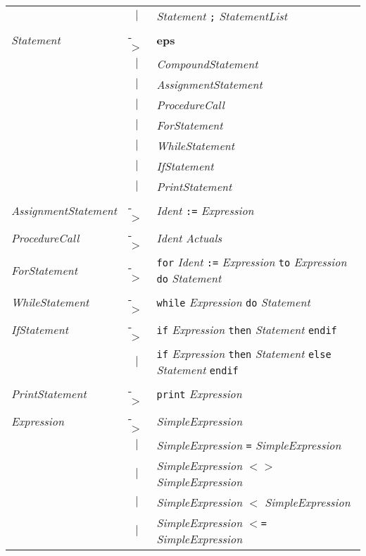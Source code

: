 \documentclass{article}
\begin{document}
\begin{center}
\begin{tabular}{lll}
 & \multicolumn{1}{c}{\textbf{$|$}} & \textit{Statement} \texttt{;} \textit{StatementList} \\
\textit{Statement} & -$>$ & \textbf{eps} \\
 & \multicolumn{1}{c}{\textbf{$|$}} & \textit{CompoundStatement} \\
 & \multicolumn{1}{c}{\textbf{$|$}} & \textit{AssignmentStatement} \\
 & \multicolumn{1}{c}{\textbf{$|$}} & \textit{ProcedureCall} \\
 & \multicolumn{1}{c}{\textbf{$|$}} & \textit{ForStatement} \\
 & \multicolumn{1}{c}{\textbf{$|$}} & \textit{WhileStatement} \\
 & \multicolumn{1}{c}{\textbf{$|$}} & \textit{IfStatement} \\
 & \multicolumn{1}{c}{\textbf{$|$}} & \textit{PrintStatement} \\
\textit{AssignmentStatement} & -$>$ & \textit{Ident} \texttt{:=} \textit{Expression} \\
\textit{ProcedureCall} & -$>$ & \textit{Ident} \textit{Actuals} \\
\textit{ForStatement} & -$>$ & \texttt{for} \textit{Ident} \texttt{:=} \textit{Expression} \texttt{to} \textit{Expression} \texttt{do} \textit{Statement} \\
\textit{WhileStatement} & -$>$ & \texttt{while} \textit{Expression} \texttt{do} \textit{Statement} \\
\textit{IfStatement} & -$>$ & \texttt{if} \textit{Expression} \texttt{then} \textit{Statement} \texttt{endif} \\
 & \multicolumn{1}{c}{\textbf{$|$}} & \texttt{if} \textit{Expression} \texttt{then} \textit{Statement} \texttt{else} \textit{Statement} \texttt{endif} \\
\textit{PrintStatement} & -$>$ & \texttt{print} \textit{Expression} \\
\textit{Expression} & -$>$ & \textit{SimpleExpression} \\
 & \multicolumn{1}{c}{\textbf{$|$}} & \textit{SimpleExpression} \texttt{=} \textit{SimpleExpression} \\
 & \multicolumn{1}{c}{\textbf{$|$}} & \textit{SimpleExpression} \texttt{$<$$>$} \textit{SimpleExpression} \\
 & \multicolumn{1}{c}{\textbf{$|$}} & \textit{SimpleExpression} \texttt{$<$} \textit{SimpleExpression} \\
 & \multicolumn{1}{c}{\textbf{$|$}} & \textit{SimpleExpression} \texttt{$<$=} \textit{SimpleExpression} \\

\end{tabular}
\end{center}
\end{document}
